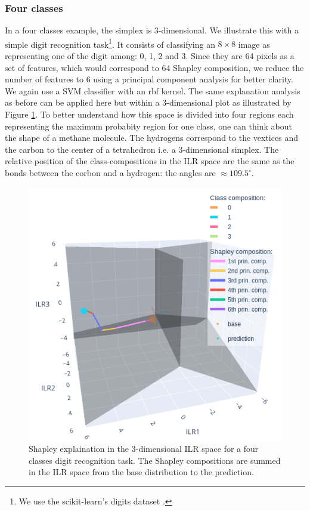 \documentclass{article}
\theoremstyle{plain}
\theoremstyle{definition}
\theoremstyle{remark}
\begin{document}
\subsubsection{Four classes}

In a four classes example, the simplex is $3$-dimensional. We illustrate this with a simple digit recognition task\footnote{We use the scikit-learn's digits dataset \cite{pedregosa2011scikit}.}. It consists of classifying an $8\times8$ image as representing one of the digit among: 0, 1, 2 and 3. Since they are 64 pixels as a set of features, which would correspond to 64 Shapley composition, we reduce the number of features to 6 using a principal component analysis for better clarity. We again use a SVM classifier with an rbf kernel. The same explanation analysis as before can be applied here but within a $3$-dimensional plot as illustrated by Figure \ref{fig:4classesshapsum}. To better understand how this space is divided into four regions each representing the maximum probabity region for one class, one can think about the shape of a methane molecule. The hydrogens correspond to the vextices and the carbon to the center of a tetrahedron i.e. a $3$-dimensional simplex. The relative position of the class-compositions in the ILR space are the same as the bonds between the corbon and a hydrogen: the angles are $\approx 109.5^{\circ}$.
\begin{figure}
  \centering
  \includegraphics[width=0.9\linewidth]{figures/4classes/ilrplotsum.png}
  \caption{Shapley explaination in the $3$-dimensional ILR space for a four classes digit recognition task. The Shapley compositions are summed in the ILR space from the base distribution to the prediction.}
  \label{fig:4classesshapsum}
\end{figure}
\end{document}
